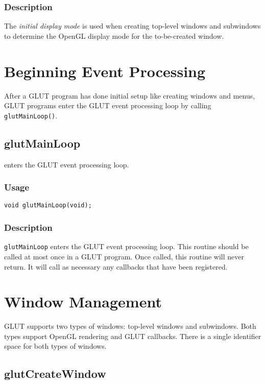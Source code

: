 \subsubsection*{Description}

The {\em initial display mode} is used when creating top-level windows and
subwindows to determine the OpenGL display mode for the to-be-created window.

\section{Beginning Event Processing}

After a GLUT program has done initial setup like creating windows and menus, GLUT
programs enter the GLUT event processing loop by calling {\tt glutMainLoop()}.

\subsection{glutMainLoop}

 enters the GLUT event processing loop.

\subsubsection*{Usage}

\begin{verbatim}
void glutMainLoop(void);
\end{verbatim}
 
\subsubsection*{Description}

{\tt glutMainLoop} enters the GLUT event processing loop.
This routine should be called at most once in a GLUT program.  Once called, this routine
will never return.  It will call as necessary any callbacks that have been registered.

\section{Window Management}

GLUT supports two types of windows:  top-level windows and subwindows.
Both types support OpenGL rendering and GLUT callbacks.  There is a
single identifier space for both types of windows.

\subsection{glutCreateWindow}

